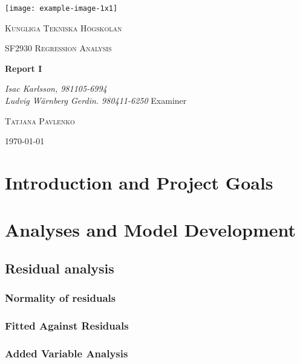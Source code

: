\documentclass[11pt]{article}
\author{Ludde}
\date{\today}
\title{}
\begin{document}
\begin{titlepage}
\centering
\texttt{[image: example-image-1x1]}\par\vspace{1cm}
{\scshape\LARGE Kungliga Tekniska Högskolan \par}
\vspace{1cm}
{\scshape\Large SF2930 Regression Analysis \par}
\vspace{1.5cm}
{\huge\bfseries Report I \\  \par}
\vspace{2cm}
{\Large\itshape Isac Karlsson, 981105-6994\\ Ludvig Wärnberg Gerdin. 980411-6250}
\vfill
Examiner \par
\textsc{Tatjana Pavlenko}

\vfill

{\large \today\par}
\end{titlepage}

\newpage
\tableofcontents
\newpage

\section{Introduction and Project Goals}
\label{sec:orgc750fb9}
\section{Analyses and Model Development}
\label{sec:orgbe5160a}
\subsection{Residual analysis}
\label{sec:org5bbc1dc}
\subsubsection{Normality of residuals}
\label{sec:org67109ee}

\subsubsection{Fitted Against Residuals}
\label{sec:org51dae8c}

\subsubsection{Added Variable Analysis}
\label{sec:org37d4283}
\end{document}
